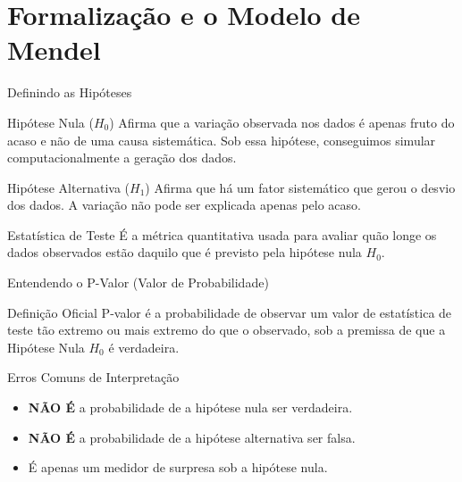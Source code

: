 \section{Formalização e o Modelo de Mendel}

\begin{frame}{Definindo as Hipóteses}
    \begin{block}{Hipótese Nula ($H_0$)}
        Afirma que a variação observada nos dados é apenas fruto do acaso e não de uma causa sistemática. Sob essa hipótese, conseguimos simular computacionalmente a geração dos dados.
    \end{block}
    \begin{block}{Hipótese Alternativa ($H_1$)}
        Afirma que há um fator sistemático que gerou o desvio dos dados. A variação não pode ser explicada apenas pelo acaso.
    \end{block}
    \begin{alertblock}{Estatística de Teste}
        É a métrica quantitativa usada para avaliar quão longe os dados observados estão daquilo que é previsto pela hipótese nula $H_0$.
    \end{alertblock}
\end{frame}

\begin{frame}{Entendendo o P-Valor (Valor de Probabilidade)}
    \begin{block}{Definição Oficial}
        P-valor é a probabilidade de observar um valor de estatística de teste tão extremo ou mais extremo do que o observado, sob a premissa de que a Hipótese Nula $H_0$ é verdadeira.
    \end{block}
    \begin{alertblock}{Erros Comuns de Interpretação}
        \begin{itemize}
            \item \textbf{NÃO É} a probabilidade de a hipótese nula ser verdadeira.
            \item \textbf{NÃO É} a probabilidade de a hipótese alternativa ser falsa.
            \item É apenas um medidor de surpresa sob a hipótese nula.
        \end{itemize}
    \end{alertblock}
\end{frame}


